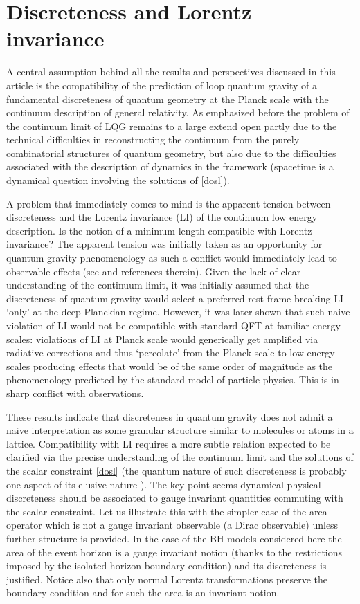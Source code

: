 \documentclass[aps, nofootinbib,superscriptaddress,12pt]{revtex4-2}
\begin{document}
\section{Discreteness and Lorentz invariance}\label{LIV}

A central assumption behind all the results and perspectives discussed in this article is the compatibility of the prediction of loop quantum gravity of a fundamental discreteness of quantum geometry at the Planck scale with the continuum description of general relativity. As emphasized before the problem of the continuum limit of LQG remains to a large extend open  partly  due to the technical difficulties in reconstructing the continuum from the purely  combinatorial structures of quantum geometry, but also due to the difficulties associated with the description of dynamics in the framework (spacetime is a dynamical question involving the solutions of \eqref{dosl}). 

A problem that immediately comes to mind is the apparent tension between discreteness and the Lorentz invariance (LI) of the continuum low energy description. Is the notion of a minimum length compatible with Lorentz invariance? The apparent tension was initially taken as an opportunity for quantum gravity phenomenology as such a conflict would immediately lead to observable effects (see \cite{Mattingly:2005re} and references therein). Given the lack of clear understanding of the continuum limit,  it was initially assumed that the discreteness of quantum gravity would select a preferred rest frame  breaking LI  `only' at the deep Planckian regime. However, it was later shown \cite{Perez:2003un, Collins:2004bp,  Collins:2006bw, Polchinski:2011za} that such naive violation of LI would not be compatible with standard QFT at familiar energy scales: violations of LI at Planck scale would generically get amplified via radiative corrections and thus `percolate' from the Planck scale to low energy scales producing effects that would be of the same order of magnitude as the phenomenology predicted by the standard model of particle physics. This is in sharp conflict with observations.

These results indicate that discreteness in quantum gravity does not admit a naive interpretation as some granular structure similar to molecules or atoms in a lattice. Compatibility with LI requires a more subtle relation expected to be clarified via the precise understanding of the continuum limit and the solutions of the scalar constraint \eqref{dosl} (the quantum nature of such discreteness is probably one aspect of its elusive nature \cite{Rovelli:2002vp}). The key point seems dynamical physical discreteness should be associated to gauge invariant quantities commuting with the scalar constraint. Let us illustrate this with the simpler case of the area operator which is not a gauge invariant observable (a Dirac observable) unless further structure is provided.  In the case of the BH models considered here the area of the event horizon is a gauge invariant notion (thanks to the restrictions imposed by the isolated horizon boundary condition) and its discreteness is justified. Notice also that only normal Lorentz transformations preserve the boundary condition and for such the area is an invariant notion. 
\end{document}
